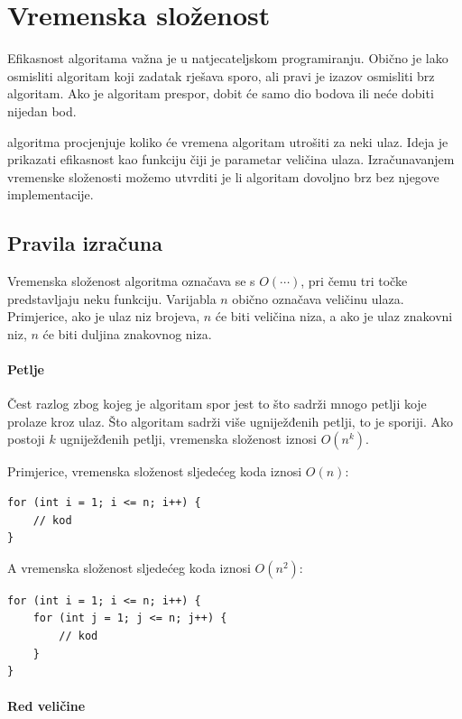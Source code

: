 \chapter{Vremenska složenost}


Efikasnost algoritama važna je u natjecateljskom programiranju.
Obično je lako osmisliti algoritam
koji zadatak rješava sporo,
ali pravi je izazov osmisliti
brz algoritam.
Ako je algoritam prespor, dobit će samo
dio bodova ili neće dobiti nijedan bod.

 algoritma
procjenjuje koliko će vremena algoritam utrošiti
za neki ulaz.
Ideja je prikazati efikasnost
kao funkciju čiji je parametar veličina ulaza.
Izračunavanjem vremenske složenosti
možemo utvrditi je li algoritam dovoljno brz
bez njegove implementacije.

\section{Pravila izračuna}

Vremenska složenost algoritma
označava se s $O(\cdots)$,
pri čemu tri točke predstavljaju neku
funkciju.
Varijabla $n$ obično označava
veličinu ulaza.
Primjerice, ako je ulaz niz brojeva,
$n$ će biti veličina niza,
a ako je ulaz znakovni niz,
$n$ će biti duljina znakovnog niza.

\subsubsection*{Petlje}

Čest razlog zbog kojeg je algoritam spor jest
to što sadrži mnogo petlji koje prolaze kroz ulaz.
Što algoritam sadrži više ugniježđenih petlji,
to je sporiji.
Ako postoji $k$ ugniježđenih petlji,
vremenska složenost iznosi $O(n^k)$.

Primjerice, vremenska složenost sljedećeg koda iznosi $O(n)$:
\begin{lstlisting}
for (int i = 1; i <= n; i++) {
    // kod
}
\end{lstlisting}

A vremenska složenost sljedećeg koda iznosi $O(n^2)$:
\begin{lstlisting}
for (int i = 1; i <= n; i++) {
    for (int j = 1; j <= n; j++) {
        // kod
    }
}
\end{lstlisting}

\subsubsection*{Red veličine}

